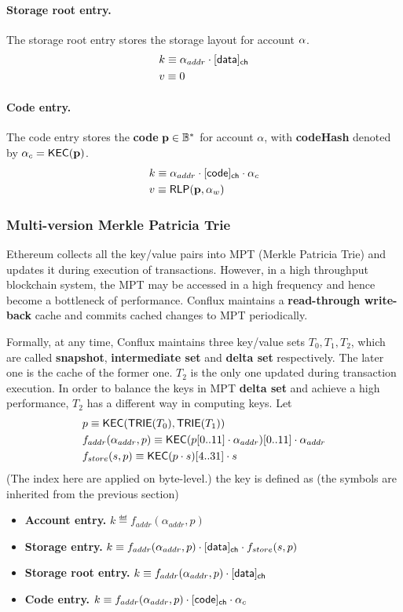 \paragraph{Storage root entry.} The storage root entry stores the storage layout for account $\mathbf{\alpha}$. 
\begin{align}
	&k\equiv \alpha_{addr}\cdot [{\sf data}]_{\sf ch}\\
	&v\equiv 0
\end{align}

\paragraph{Code entry.} The code entry stores the {\bf code} $\bf p\in \mathbb{B}^*$ for account $\alpha$, with {\bf codeHash} denoted by $\alpha_c=\mathsf{KEC}({\bf p})$. 
\begin{align}
	&k\equiv \alpha_{addr}\cdot [{\sf code}]_{\sf ch}\cdot \alpha_c  \\
	&v\equiv \mathsf{RLP}({\bf p},\alpha_w)
\end{align}

\subsubsection{Multi-version Merkle Patricia Trie}

Ethereum collects all the key/value pairs into MPT (Merkle Patricia Trie) and updates it during execution of transactions. However, in a high throughput blockchain system, the MPT may be accessed in a high frequency and hence become a bottleneck of performance. Conflux maintains a \textbf{read-through write-back} cache and commits cached changes to MPT periodically. 

Formally, at any time, Conflux maintains three key/value sets $T_0,T_1,T_2$, which are called {\bf snapshot}, {\bf intermediate set} and {\bf delta set} respectively. The later one is the cache of the former one. $T_2$ is the only one updated during transaction execution. In order to balance the keys in MPT {\bf delta set} and achieve a high performance, $T_2$ has a different way in computing keys. Let 
%
\begin{align}
	&p\equiv\mathsf{KEC}(\mathsf{TRIE}(T_0),\mathsf{TRIE}(T_1)) \\
	&f_{addr}(\alpha_{addr},p)\equiv\mathsf{KEC}(p[0..11]\cdot \alpha_{addr})[0..11]\cdot \alpha_{addr} \\ 
	&f_{store}(s,p)\equiv \mathsf{KEC}(p\cdot s)[4..31]\cdot s
\end{align}
(The index here are applied on byte-level.)
the key is defined as (the symbols are inherited from the previous section)
\begin{itemize}[nosep]
	\item {\bf Account entry.} $k\eqdef f_{addr}(\alpha_{addr},p)$
	\item {\bf Storage entry.} $k\equiv f_{addr}(\alpha_{addr},p)\cdot [{\sf data}]_{\sf ch}\cdot f_{store}(s,p)$
	\item {\bf Storage root entry.} $k\equiv f_{addr}(\alpha_{addr},p)\cdot [{\sf data}]_{\sf ch}$
	\item {\bf Code entry.} $k\equiv f_{addr}(\alpha_{addr},p)\cdot [{\sf code}]_{\sf ch}\cdot \alpha_c$
\end{itemize}

